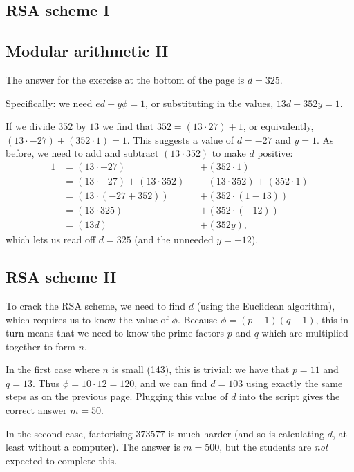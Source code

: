 \documentclass[12pt]{article}
\begin{document}
\subsection{RSA scheme I}

\subsection{Modular arithmetic II}

The answer for the exercise at the bottom of the page is $d = 325$.

Specifically: we need $ed + y\phi = 1$, or substituting in the values, $13d + 352y = 1$.

If we divide $352$ by $13$ we find that $352 = (13 \cdot 27) + 1$, or equivalently, $(13 \cdot -27) + (352 \cdot 1) = 1$.
This suggests a value of $d = -27$ and $y = 1$.
As before, we need to add and subtract $(13 \cdot 352)$ to make $d$ positive:
\begin{align*}
    1 &= (13 \cdot -27) & &+ (352 \cdot 1) \\
      &= (13 \cdot -27) + (13 \cdot 352) & &- (13 \cdot 352) + (352 \cdot 1) \\
      &= (13 \cdot (-27 + 352)) & &+ (352 \cdot (1 - 13)) \\
      &= (13 \cdot 325) & &+ (352 \cdot (-12)) \\
      &= (13d) & &+ (352y),
\end{align*}
which lets us read off $d = 325$ (and the unneeded $y = -12$).

\subsection{RSA scheme II}

To crack the RSA scheme, we need to find $d$ (using the Euclidean algorithm), which requires us to know the value of $\phi$.
Because $\phi = (p - 1)(q - 1)$, this in turn means that we need to know the prime factors $p$ and $q$ which are multiplied together to form $n$.

In the first case where $n$ is small (143), this is trivial: we have that $p = 11$ and $q = 13$.
Thus $\phi = 10 \cdot 12 = 120$, and we can find $d = 103$ using exactly the same steps as on the previous page.
Plugging this value of $d$ into the script gives the correct answer $m = 50$.

In the second case, factorising $373577$ is much harder (and so is calculating $d$, at least without a computer).
The answer is $m = 500$, but the students are \textit{not} expected to complete this.
\end{document}

